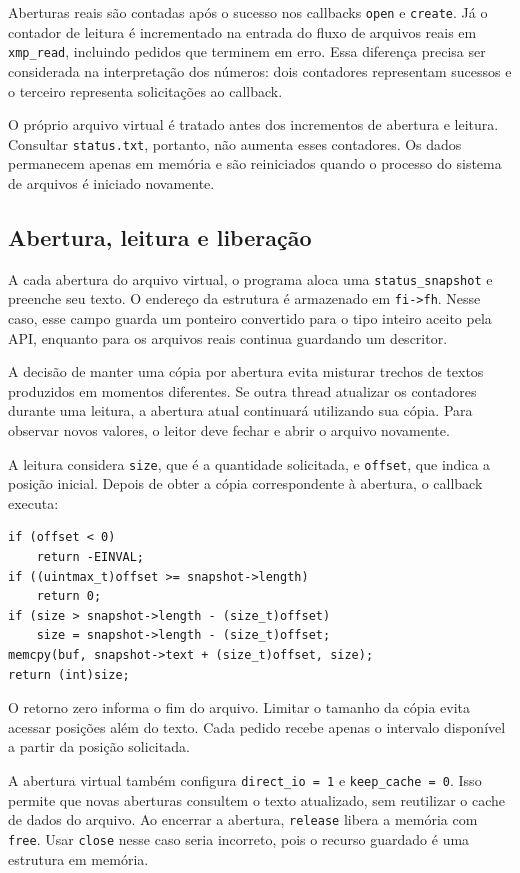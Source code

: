 \documentclass[12pt]{article}
\begin{document}
Aberturas reais são contadas após o sucesso nos callbacks
\texttt{open} e \texttt{create}. Já o contador de leitura é incrementado
na entrada do fluxo de arquivos reais em \texttt{xmp\_read}, incluindo
pedidos que terminem em erro. Essa diferença precisa ser considerada
na interpretação dos números: dois contadores representam sucessos
e o terceiro representa solicitações ao callback.

O próprio arquivo virtual é tratado antes dos incrementos de abertura
e leitura. Consultar \texttt{status.txt}, portanto, não aumenta esses
contadores. Os dados permanecem apenas em memória e são reiniciados
quando o processo do sistema de arquivos é iniciado novamente.

\subsection{Abertura, leitura e liberação}

A cada abertura do arquivo virtual, o programa aloca uma
\texttt{status\_snapshot} e preenche seu texto. O endereço da estrutura
é armazenado em \texttt{fi->fh}. Nesse caso, esse campo guarda um
ponteiro convertido para o tipo inteiro aceito pela API, enquanto
para os arquivos reais continua guardando um descritor.

A decisão de manter uma cópia por abertura evita misturar trechos de
textos produzidos em momentos diferentes. Se outra thread atualizar
os contadores durante uma leitura, a abertura atual continuará
utilizando sua cópia. Para observar novos valores, o leitor deve
fechar e abrir o arquivo novamente.

A leitura considera \texttt{size}, que é a quantidade solicitada,
e \texttt{offset}, que indica a posição inicial. Depois de obter a
cópia correspondente à abertura, o callback executa:

\begin{lstlisting}
if (offset < 0)
    return -EINVAL;
if ((uintmax_t)offset >= snapshot->length)
    return 0;
if (size > snapshot->length - (size_t)offset)
    size = snapshot->length - (size_t)offset;
memcpy(buf, snapshot->text + (size_t)offset, size);
return (int)size;
\end{lstlisting}

O retorno zero informa o fim do arquivo. Limitar o tamanho da cópia
evita acessar posições além do texto. Cada pedido recebe apenas o
intervalo disponível a partir da posição solicitada.

A abertura virtual também configura \texttt{direct\_io = 1} e
\texttt{keep\_cache = 0}. Isso permite que novas aberturas consultem
o texto atualizado, sem reutilizar o cache de dados do arquivo.
Ao encerrar a abertura, \texttt{release} libera a memória com
\texttt{free}. Usar \texttt{close} nesse caso seria incorreto, pois
o recurso guardado é uma estrutura em memória.
\end{document}
